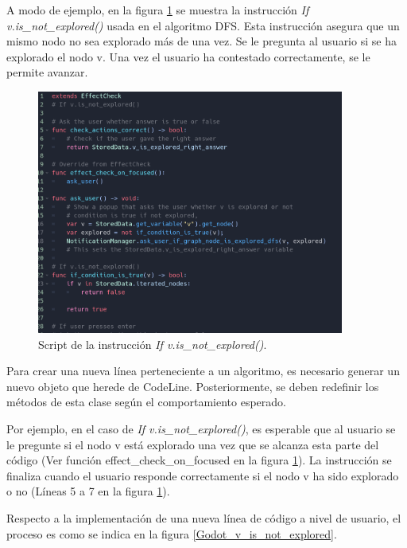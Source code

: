 \restoregeometry

A modo de ejemplo, en la figura \ref{v_is_not_explored_effect_check} se muestra la instrucción \emph{If v.is\_not\_explored()} usada en el algoritmo DFS. Esta instrucción asegura que un mismo nodo no sea explorado más de una vez. Se le pregunta al usuario si se ha explorado el nodo v. Una vez el usuario ha contestado correctamente, se le permite avanzar.

\begin{figure}[h!]
	\centering
	\includegraphics[width=0.9\textwidth]{imagenes/v_is_not_explored_effect_check_1.png}
	\caption{Script de la instrucción \emph{If v.is\_not\_explored()}.}
	\label{v_is_not_explored_effect_check}
\end{figure}

Para crear una nueva línea perteneciente a un algoritmo, es necesario generar un nuevo objeto que herede de CodeLine. Posteriormente, se deben redefinir los métodos de esta clase según el comportamiento esperado. 

Por ejemplo, en el caso de \emph{If v.is\_not\_explored()}, es esperable que al usuario se le pregunte si el nodo v está explorado una vez que se alcanza esta parte del código (Ver función effect\_check\_on\_focused en la figura \ref{v_is_not_explored_effect_check}). La instrucción se finaliza cuando el usuario responde correctamente si el nodo v ha sido explorado o no (Líneas 5 a 7 en la figura \ref{v_is_not_explored_effect_check}).

Respecto a la implementación de una nueva línea de código a nivel de usuario, el proceso es como se indica en la figura \ref{Godot_v_is_not_explored}. 

